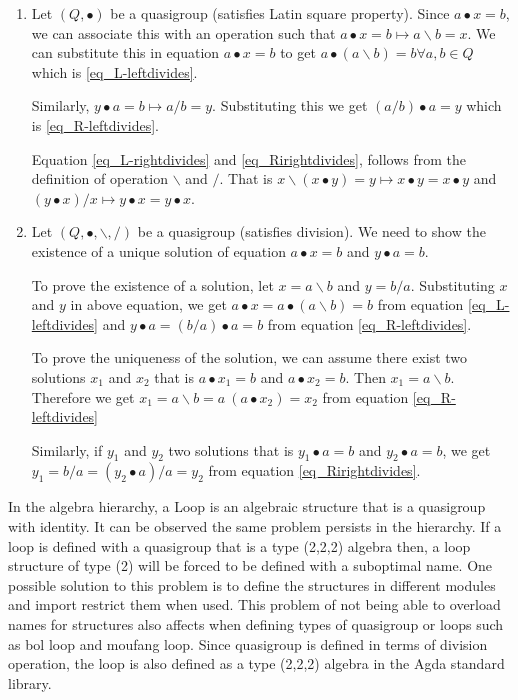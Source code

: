 \begin{enumerate}
  \item 
Let $(Q, ∙)$ be a quasigroup (satisfies Latin square property). Since $ a ∙ x =
b$, we can associate this with an operation such that $a ∙ x = b \mapsto a
\backslash b = x$. We can substitute this in equation $a ∙ x = b$ to get $a ∙ (a
\backslash b) = b \forall a,b \in Q$ which is \ref{eq_L-leftdivides}.

Similarly, $y ∙ a = b \mapsto a / b = y$. Substituting this we get $ (a / b) ∙ a
= y$ which is \ref{eq_R-leftdivides}.

Equation \ref{eq_L-rightdivides} and \ref{eq_Rirightdivides}, follows from the
definition of operation $\backslash$ and $/$. That is $x \backslash (x ∙ y) = y \mapsto x
∙ y = x ∙ y$ and $(y ∙ x) /x \mapsto y ∙ x = y ∙ x$.

\item 
Let $(Q,∙, \backslash, /)$ be a quasigroup (satisfies division). We need to show
the existence of a unique solution of equation $ a ∙ x = b$ and $y ∙ a = b$.

To prove the existence of a solution, let $x = a\backslash b$ and $y = b / a$.
Substituting $x$ and $y$ in above equation, we get $a ∙ x = a ∙ (a \backslash b)
= b$ from equation \ref{eq_L-leftdivides} and $ y ∙ a = (b / a) ∙ a = b$ from
equation \ref{eq_R-leftdivides}.

To prove the uniqueness of the solution, we can assume there exist two
solutions $x_1$ and $x_2$ that is $a ∙ x_1 = b$ and $a ∙ x_2 = b$. Then $x_1 = a \backslash b$.
Therefore we get $x_1 = a \backslash b = a \ (a ∙ x_2) = x_2$ from equation \ref{eq_R-leftdivides}

Similarly, if $y_1$ and $y_2$ two solutions that is $y_1 ∙ a = b$ and $y_2 ∙ a = b$, we get 
$y_1 = b / a = (y_2 ∙ a) / a = y_2$ from equation \ref{eq_Rirightdivides}.

\end{enumerate}

In the algebra hierarchy, a Loop is an algebraic structure that is a quasigroup
with identity. It can be observed the same problem persists in the hierarchy. If
a loop is defined with a quasigroup that is a type (2,2,2) algebra then, a loop
structure of type (2) will be forced to be defined with a suboptimal name. One
possible solution to this problem is to define the structures in different
modules and import restrict them when used. This problem of not being able to
overload names for structures also affects when defining types of quasigroup or
loops such as bol loop and moufang loop. Since quasigroup is defined in terms of
division operation, the loop is also defined as a type (2,2,2) algebra in the Agda
standard library.

